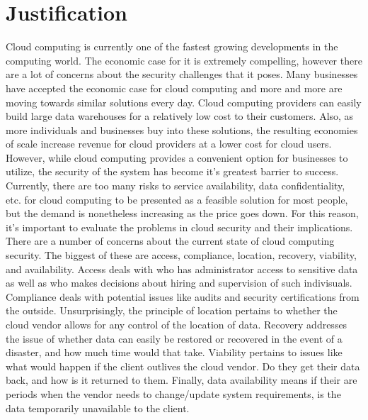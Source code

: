\documentclass[a4paper, 8pt]{article} %
\begin{document}
\section*{Justification}

Cloud computing is currently one of the fastest growing developments in the computing world.  The economic case for it is extremely compelling, however there are a lot of concerns about the security challenges that it poses.  Many businesses have accepted the economic case for cloud computing and more and more are moving towards similar solutions every day.  Cloud computing providers can easily build large data warehouses for a relatively low cost to their customers.  Also, as more individuals and businesses buy into these solutions, the resulting economies of scale increase revenue for cloud providers at a lower cost for cloud users.  However, while cloud computing provides a convenient option for businesses to utilize, the security of the system has become it's greatest barrier to success.  Currently, there are too many risks to service availability, data confidentiality, etc. for cloud computing to be presented as a feasible solution for most people, but the demand is nonetheless increasing as the price goes down.  For this reason, it's important to evaluate the problems in cloud security and their implications.  There are a number of concerns about the current state of cloud computing security.  The biggest of these are access, compliance, location, recovery, viability, and availability.  Access deals with who has administrator access to sensitive data as well as who makes decisions about hiring and supervision of such indivisuals.  Compliance deals with potential issues like audits and security certifications from the outside.  Unsurprisingly, the principle of location pertains to whether the cloud vendor allows for any control of the location of data.  Recovery addresses the issue of whether data can easily be restored or recovered in the event of a disaster, and how much time would that take.  Viability pertains to issues like what would happen if the client outlives the cloud vendor.  Do they get their data back, and how is it returned to them.  Finally, data availability means if their are periods when the vendor needs to change/update system requirements, is the data temporarily unavailable to the client.  
\end{document}
